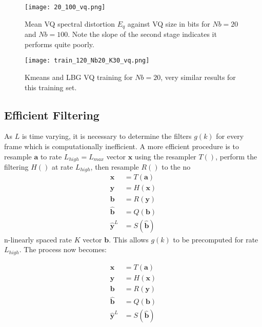 \documentclass{article}
\begin{document}
\begin{figure}[h]
\caption{Mean VQ spectral distortion $E_q$ against VQ size in bits for $Nb=20$ and $Nb=100$.  Note the slope of the second stage indicates it performs quite poorly.}
\label{fig:20_100_vq}
\begin{center}
\texttt{[image: 20\_100\_vq.png]}
\end{center}
\end{figure}

\begin{figure}[h]
\caption{Kmeans and LBG VQ training for $Nb=20$, very similar results for this training set.}
\label{fig:train_120_Nb20_K30_vq}
\begin{center}
\texttt{[image: train\_120\_Nb20\_K30\_vq.png]}
\end{center}
\end{figure}

\subsection{Efficient Filtering}

As $L$ is time varying, it is necessary to determine the filters $g(k)$ for every frame which is computationally inefficient.  A more efficient procedure is to resample $\mathbf{a}$ to rate $L_{high}=L_{max}$ vector $\mathbf{x}$ using the resampler $T()$, perform the filtering $H()$ at rate $L_{high}$, then resample $R()$ to the no\begin{equation}
\begin{split}
\mathbf{x} &=T(\mathbf{a}) \\
\mathbf{y} &= H(\mathbf{x}) \\
\mathbf{b} &= R(\mathbf{y}) \\
\hat{\mathbf{b}} &= Q(\mathbf{b}) \\
\hat{\mathbf{y}}^L &= S(\hat{\mathbf{b}})
\end{split}
\end{equation}n-linearly spaced rate $K$ vector $\mathbf{b}$.  This allows $g(k)$ to be precomputed for rate $L_{high}$.  The process now becomes:

\begin{equation}
\begin{split}
\mathbf{x} &=T(\mathbf{a}) \\
\mathbf{y} &= H(\mathbf{x}) \\
\mathbf{b} &= R(\mathbf{y}) \\
\hat{\mathbf{b}} &= Q(\mathbf{b}) \\
\hat{\mathbf{y}}^L &= S(\hat{\mathbf{b}})
\end{split}
\end{equation}
\end{document}
